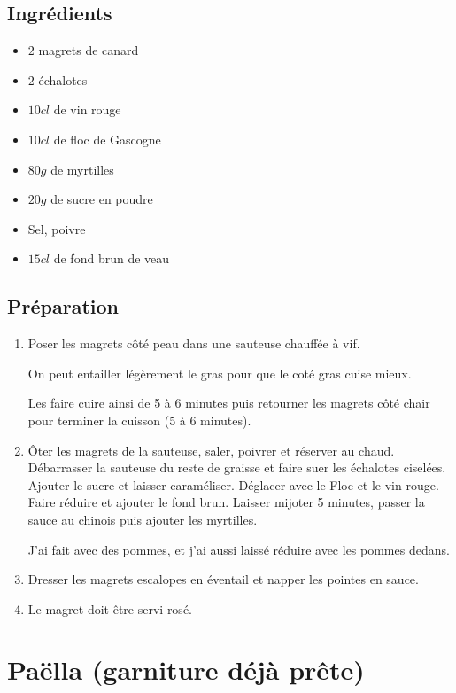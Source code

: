 \subsection*{Ingrédients}
\begin{itemize}
\item $2$ magrets de canard
\item $2$ échalotes
\item  $10 \unit{cl}$ de vin rouge
\item  $10 \unit{cl}$ de floc de Gascogne
\item  $80 \unit{g}$ de myrtilles
\item  $20 \unit{g}$ de sucre en poudre
\item  Sel, poivre
\item  $15 \unit{cl}$ de fond brun de veau
\end{itemize}

\subsection*{Préparation}
\begin{enumerate}
\item Poser les magrets côté peau dans une sauteuse chauffée à vif.
\begin{remarque}
On peut entailler légèrement le gras pour que le coté gras cuise mieux.
\end{remarque}
Les faire cuire ainsi de 5 à 6 minutes puis retourner les magrets côté chair pour
terminer la cuisson (5 à 6 minutes).
\item Ôter les magrets de la sauteuse, saler, poivrer et réserver au chaud.
Débarrasser la sauteuse du reste de graisse et faire suer les échalotes
ciselées. Ajouter le sucre et laisser caraméliser. Déglacer avec le Floc
et le vin rouge. Faire réduire et ajouter le fond brun. Laisser mijoter
5 minutes, passer la sauce au chinois puis ajouter les myrtilles.
\begin{remarque}
J'ai fait avec des pommes, et j'ai aussi laissé réduire avec les pommes dedans.
\end{remarque}
\item Dresser les magrets escalopes en éventail et napper les pointes en sauce.
\item Le magret doit être servi rosé.
\end{enumerate}

\newpage
\section{Paëlla (garniture déjà prête)}
